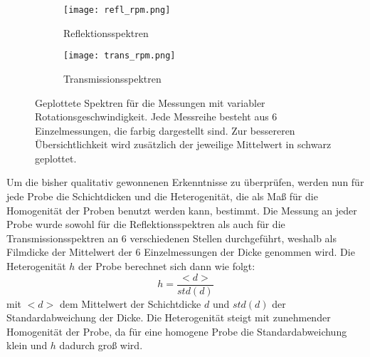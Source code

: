 \begin{figure}[h!]
    \centering
    \begin{subfigure}{.5\textwidth}
      \centering
      \texttt{[image: refl\_rpm.png]}
      \caption{Reflektionsspektren}
      \label{fig:refl_rpm}
    \end{subfigure}%
    \begin{subfigure}{.5\textwidth}
      \centering
      \texttt{[image: trans\_rpm.png]}
      \caption{Transmissionsspektren}
      \label{fig:trans_rpm}
    \end{subfigure}
    \caption{Geplottete Spektren für die Messungen mit variabler Rotationsgeschwindigkeit. Jede Messreihe besteht aus 6 Einzelmessungen, die farbig dargestellt sind. Zur bessereren Übersichtlichkeit wird zusätzlich der jeweilige Mittelwert in schwarz geplottet.}
    \label{fig:rpm_spektren}
\end{figure}

Um die bisher qualitativ gewonnenen Erkenntnisse zu überprüfen, werden nun für jede Probe die Schichtdicken und die Heterogenität, die als Maß für die Homogenität der Proben benutzt werden kann, bestimmt. Die Messung an jeder Probe wurde sowohl für die Reflektionsspektren als auch für die Transmissionsspektren an 6 verschiedenen Stellen durchgeführt, weshalb als Filmdicke der Mittelwert der 6 Einzelmessungen der Dicke genommen wird. Die Heterogenität $h$ der Probe berechnet sich dann wie folgt:
\begin{equation}
    h = \frac{<d>}{std(d)}
\end{equation}
mit $<d>$ dem Mittelwert der Schichtdicke $d$ und $std(d)$ der Standardabweichung der Dicke. Die Heterogenität steigt mit zunehmender Homogenität der Probe, da für eine homogene Probe die Standardabweichung klein und $h$ dadurch groß wird. 

